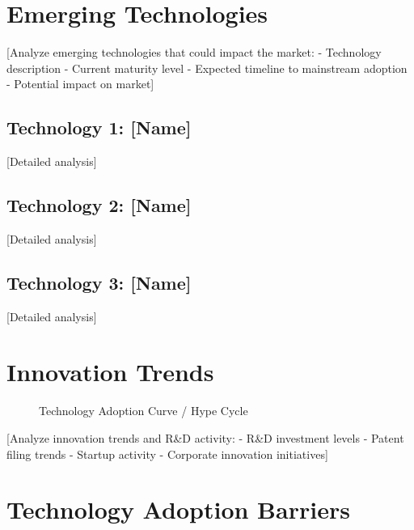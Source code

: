 \documentclass[11pt,letterpaper]{report}
\begin{document}
\section{Emerging Technologies}

[Analyze emerging technologies that could impact the market:
- Technology description
- Current maturity level
- Expected timeline to mainstream adoption
- Potential impact on market]

\subsection{Technology 1: [Name]}
[Detailed analysis]

\subsection{Technology 2: [Name]}
[Detailed analysis]

\subsection{Technology 3: [Name]}
[Detailed analysis]

\section{Innovation Trends}


\begin{figure}[htbp]
\centering
\caption{Technology Adoption Curve / Hype Cycle}
\label{fig:innovation}
\end{figure}

[Analyze innovation trends and R\&D activity:
- R\&D investment levels
- Patent filing trends
- Startup activity
- Corporate innovation initiatives]

\section{Technology Adoption Barriers}
\end{document}
